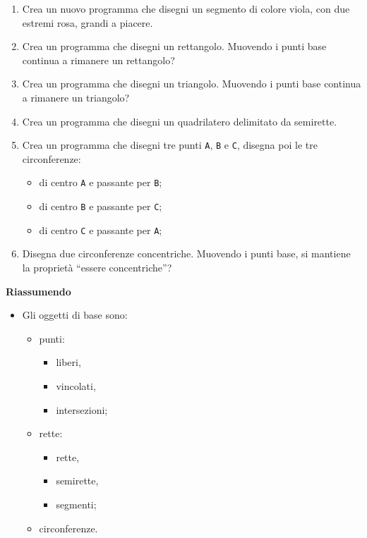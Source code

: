 \begin{enumerate} [noitemsep]
\item Crea un nuovo programma che disegni un segmento di colore viola,
con due estremi rosa, grandi a piacere.
\item Crea un programma che disegni un rettangolo. Muovendo i punti base
continua a rimanere un rettangolo?
\item Crea un programma che disegni un triangolo. Muovendo i punti base
continua a rimanere un triangolo?
\item Crea un programma che disegni un quadrilatero delimitato da semirette.
\item Crea un programma che disegni tre punti \texttt{A}, \texttt{B} e 
\texttt{C}, disegna poi le tre circonferenze:

\begin{itemize} [noitemsep]
\item di centro \texttt{A} e passante per \texttt{B};
\item di centro \texttt{B} e passante per \texttt{C};
\item di centro \texttt{C} e passante per \texttt{A};
\end{itemize}

\item Disegna due circonferenze concentriche. Muovendo i punti base, si 
mantiene la proprietà ``essere concentriche''?
\end{enumerate}

\textbf{Riassumendo}
\begin{itemize} [noitemsep]
\item Gli oggetti di base sono:
\begin{itemize} [nosep]
\item punti:
\begin{itemize} [nosep]
\item liberi,
\item vincolati,
\item intersezioni;
\end{itemize}

\item rette:
\begin{itemize} [nosep]
\item rette,
\item semirette,
\item segmenti;
\end{itemize}
\item circonferenze.
\end{itemize}
\end{itemize}

